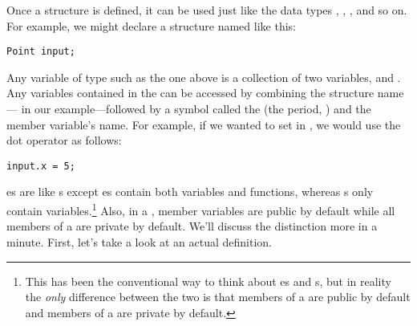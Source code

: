 Once a structure is defined, it can be used just like the data types , , , and so on. 
For example, we might declare a  structure named  like this:

\noindent\begin{minipage}{\linewidth}\begin{lstlisting}
Point input;
\end{lstlisting}\end{minipage}


Any variable of type  such as the one above is a collection of two variables,  and . 
Any variables contained in the  can be accessed by combining the structure name--- in our example---followed by a symbol called the  (the period, ) and the member variable's name. 
For example, if we wanted to set  in , we would use the dot operator as follows:

\noindent\begin{minipage}{\linewidth}\begin{lstlisting}
input.x = 5;
\end{lstlisting}\end{minipage}





es are like s except es contain both variables and functions, whereas s only contain variables.\footnote{This has been the conventional way to think about es and s, but in reality the \emph{only} difference between the two is that members of a  are public by default and members of a  are private by default.} 
Also, in a , member variables are public by default while all members of a  are private by default. 
We'll discuss the distinction more in a minute. 
First, let's take a look at an actual  definition.

